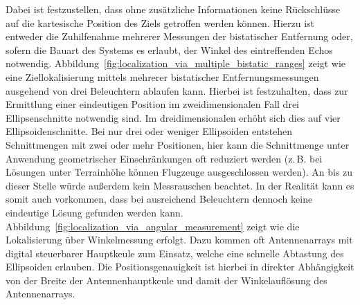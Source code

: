 Dabei ist festzustellen, dass ohne zusätzliche Informationen keine Rückschlüsse auf die kartesische Position des Ziels getroffen werden können. Hierzu ist entweder die Zuhilfenahme mehrerer Messungen der bistatischer Entfernung oder, sofern die Bauart des Systems es erlaubt, der Winkel des eintreffenden Echos notwendig. Abbildung~\ref{fig:localization_via_multiple_bistatic_ranges} zeigt wie eine Ziellokalisierung mittels mehrerer bistatischer Entfernungsmessungen ausgehend von drei Beleuchtern ablaufen kann. Hierbei ist festzuhalten, dass zur Ermittlung einer eindeutigen Position im zweidimensionalen Fall drei Ellipsenschnitte notwendig sind. Im dreidimensionalen erhöht sich dies auf vier Ellipsoidenschnitte. Bei nur drei oder weniger Ellipsoiden entstehen Schnittmengen mit zwei oder mehr Positionen, hier kann die Schnittmenge unter Anwendung geometrischer Einschränkungen oft reduziert werden (z.\,B. bei Lösungen unter Terrainhöhe können Flugzeuge ausgeschlossen werden). An bis zu dieser Stelle würde außerdem kein Messrauschen beachtet. In der Realität kann es somit auch vorkommen, dass bei ausreichend Beleuchtern dennoch keine eindeutige Lösung gefunden werden kann. Abbildung~\ref{fig:localization_via_angular_measurement} zeigt wie die Lokalisierung über Winkelmessung erfolgt. Dazu kommen oft Antennenarrays mit digital steuerbarer Hauptkeule zum Einsatz, welche eine schnelle Abtastung des Ellipsoiden erlauben. Die Positionsgenauigkeit ist hierbei in direkter Abhängigkeit von der Breite der Antennenhauptkeule und damit der Winkelauflösung des Antennenarrays.

